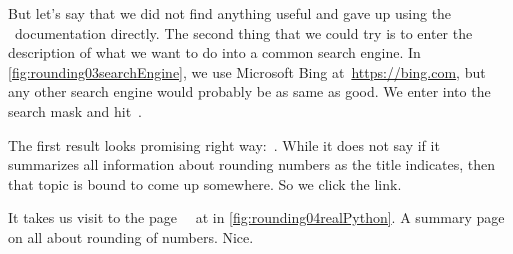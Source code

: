 %
But let's say that we did not find anything useful and gave up using the \python\ documentation directly.
The second thing that we could try is to enter the description of what we want to do into a common search engine.
In \cref{fig:rounding03searchEngine}, we use Microsoft Bing at~\url{https://bing.com}, but any other search engine would probably be as same as good.
We enter  into the search mask and hit~.

The first result looks promising right way:~.
While it does not say  if it summarizes all information about rounding numbers as the title indicates, then that topic is bound to come up somewhere.
So we click the link.

It takes us visit to the page~~\cite{D2021RPT:A2024HTRNIP} at  in \cref{fig:rounding04realPython}.
A summary page on all about rounding of numbers.
Nice.

